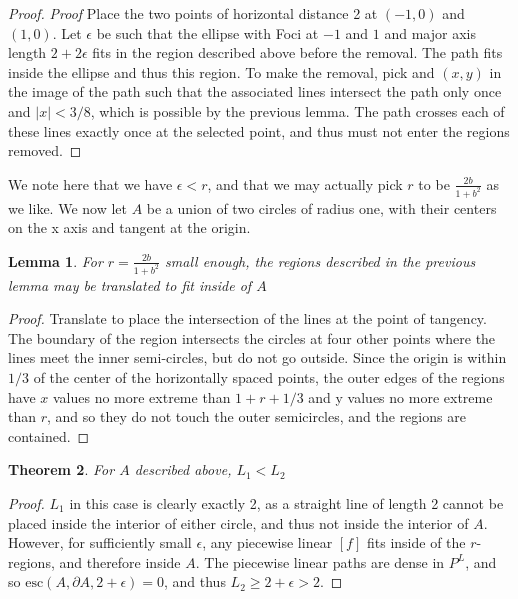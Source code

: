 \documentclass[10pt,a4paper]{article}
\newtheorem{thm}{Theorem}[section]    %
\newtheorem{lem}[thm]{Lemma}          %
\theoremstyle{definition}
\begin{document}
\begin{proof}
    \textit{Proof}
Place the two points of horizontal distance 2 at $(-1,0)$ and $(1,0)$. Let $\epsilon$ be such that the ellipse with Foci at $-1$ and $1$ and major axis length $2+2\epsilon$ fits in the region described above before the removal. The path fits inside the ellipse and thus this region. To make the removal, pick and $(x,y)$ in the image of the path such that the associated lines intersect the path only once and $|x| < 3/8$, which is possible by the previous lemma. The path crosses each of these lines exactly once at the selected point, and thus must not enter the regions removed. 
\end{proof}
We note here that we have $\epsilon < r$, and that we may actually pick $r$ to be $\frac{2b}{1+b^2}$ as we like. We now let $A$ be a union of two circles of radius one, with their centers on the x axis and tangent at the origin.

\begin{lem}
    For $r= \frac{2b}{1+b^2}$ small enough, the regions described in the previous lemma may be translated to fit inside of $A$
\end{lem}
\label{lem:translation}

\begin{proof}
    Translate to place the intersection of the lines at the point of tangency. The boundary of the region intersects the circles at four other points where the lines meet the inner semi-circles, but do not go outside. Since the origin is within $1/3$ of the center of the horizontally spaced points, the outer edges of the regions have $x$ values no more extreme than $1+r + 1/3$ and y values no more extreme than $r$, and so they do not touch the outer semicircles, and the regions are contained.
\end{proof}

\begin{thm}
    For $A$ described above, $L_1 < L_2$
\end{thm}

\begin{proof}
$L_1$ in this case is clearly exactly 2, as a straight line of length 2 cannot be placed inside the interior of either circle, and thus not inside the interior of $A$. 
However, for sufficiently small $\epsilon$, any piecewise linear $[f]$ fits inside of the $r$-regions, and therefore inside $A$. The piecewise linear paths are dense in $P^L$, and so $\mathrm{esc}(A,\partial A, 2+\epsilon) = 0$, and thus $L_2 \geq 2+\epsilon > 2$.
\end{proof}
\end{document}
